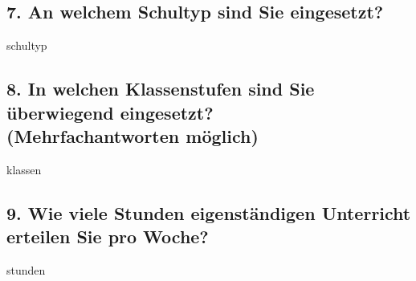 \subsection*{7. An welchem Schultyp sind Sie eingesetzt?}
\vspace{0.5cm}
\begin{questionmult}{schultyp}
	\begin{choices}
	\end{choices}
\end{questionmult}

\subsection*{8. In welchen Klassenstufen sind Sie überwiegend eingesetzt? \\
	(Mehrfachantworten möglich)}
\vspace{0.5cm}
\begin{questionmult}{klassen}
	\begin{choices}
		\scoring{b=1}
		\scoring{b=2}
		\scoring{b=3}
		\scoring{b=4}
	\end{choices}
\end{questionmult}

\subsection*{9. Wie viele Stunden eigenständigen Unterricht erteilen Sie pro Woche?}
\vspace{0.5cm}
\begin{questionmult}{stunden}
	\begin{choices}
		\scoring{b=5}
	\end{choices}
\end{questionmult}

